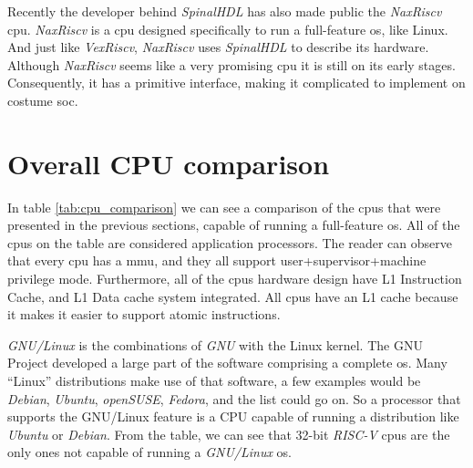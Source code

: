Recently the developer behind \textit{SpinalHDL} has also made public the \textit{NaxRiscv} \acrshort{cpu}. \textit{NaxRiscv} is a \acrshort{cpu} designed specifically to run a full-feature \acrlong{os}, like Linux. And just like \textit{VexRiscv}, \textit{NaxRiscv} uses \textit{SpinalHDL} to describe its hardware. Although \textit{NaxRiscv} seems like a very promising \acrshort{cpu} it is still on its early stages. Consequently, it has a primitive interface, making it complicated to implement on costume \acrfull{soc}.


\section{Overall CPU comparison}
\label{section:cpu_comparison}
In table \ref*{tab:cpu_comparison} we can see a comparison of the \acrshort{cpu}s that were presented in the previous sections, capable of running a full-feature \acrfull{os}. All of the \acrshort{cpu}s on the table are considered application processors. The reader can observe that every \acrshort{cpu} has a \acrfull{mmu}, and they all support \acrshort{user}+\acrshort{supervisor}+\acrshort{machine} privilege mode. Furthermore, all of the \acrshort{cpu}s hardware design have L1 Instruction Cache, and L1 Data cache system integrated. All \acrshort{cpu}s have an L1 cache because it makes it easier to support atomic instructions.

\textit{GNU/Linux} is the combinations of \textit{GNU} with the Linux kernel. The GNU Project developed a large part of the software comprising a complete \acrfull{os}. Many \enquote{Linux} distributions make use of that software, a few examples would be \textit{Debian}, \textit{Ubuntu}, \textit{openSUSE}, \textit{Fedora}, and the list could go on. So a processor that supports the GNU/Linux feature is a CPU capable of running a distribution like \textit{Ubuntu} or \textit{Debian}. From the table, we can see that 32-bit \textit{RISC-V} \acrshort{cpu}s are the only ones not capable of running a \textit{GNU/Linux} \acrfull{os}.

